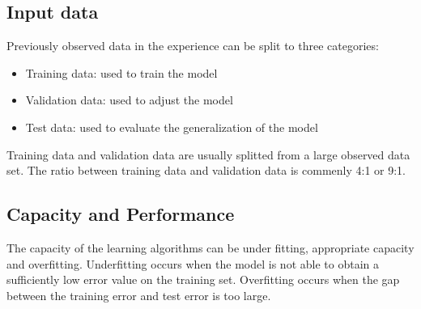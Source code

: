     \subsection{Input data}
    Previously observed data in the experience can be split to three categories:
    \begin{itemize}
        \item Training data: used to train the model
        \item Validation data: used to adjust the model
        \item Test data: used to evaluate the generalization of the model
    \end{itemize}
    Training data and validation data are usually splitted from a large observed data set. The ratio between training data and validation data is commenly 4:1 or 9:1.
    \subsection{Capacity and Performance}	

    The capacity of the learning algorithms can be under fitting, appropriate capacity and overfitting. Underfitting occurs when the model is not able to obtain a sufficiently low error value on the training set. Overfitting occurs when the gap between the training error and test error is too large.

